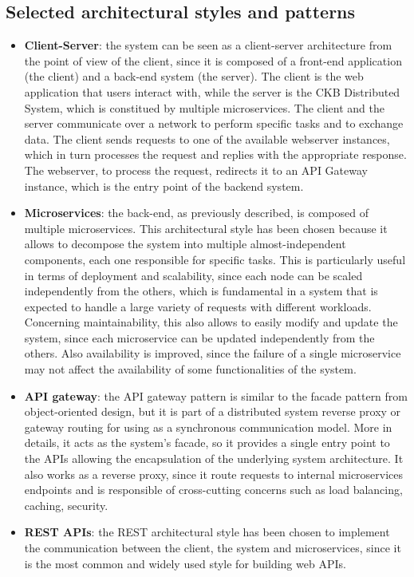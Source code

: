 \subsection{Selected architectural styles and patterns}
\begin{itemize}
    \item \textbf{Client-Server}: the system can be seen as a client-server architecture from the point of view of the client, since it is composed of a front-end application (the client) and a back-end system (the server). The client is the web application that users interact with, while the server is the CKB Distributed System, which is constitued by multiple microservices. 
    The client and the server communicate over a network to perform specific tasks and to exchange data. The client sends requests to one of the available webserver instances, which in turn processes the request and replies with the appropriate response.
    The webserver, to process the request, redirects it to an API Gateway instance, which is the entry point of the backend system.
    \item \textbf{Microservices}: the back-end, as previously described, is composed of multiple microservices. This architectural style has been chosen because it allows to decompose the system into multiple almost-independent components, each one responsible for specific tasks.
    This is particularly useful in terms of deployment and scalability, since each node can be scaled independently from the others, which is fundamental in a system that is expected to handle a large variety of requests with different workloads.
    Concerning maintainability, this also allows to easily modify and update the system, since each microservice can be updated independently from the others.
    Also availability is improved, since the failure of a single microservice may not affect the availability of some functionalities of the system.
    \item \textbf{API gateway}: the API gateway pattern is similar to the facade pattern from object-oriented design, but it is part of a distributed system reverse proxy or gateway routing for using as a synchronous communication model.
    More in details, it acts as the system's facade, so it provides a single entry point to the APIs allowing the encapsulation of the underlying system architecture.
    It also works as a reverse proxy, since it route requests to internal microservices endpoints and is responsible of cross-cutting concerns such as load balancing, caching, security.
    \item \textbf{REST APIs}: the REST architectural style has been chosen to implement the communication between the client, the system and microservices, since it is the most common and widely used style for building web APIs.

\end{itemize}

